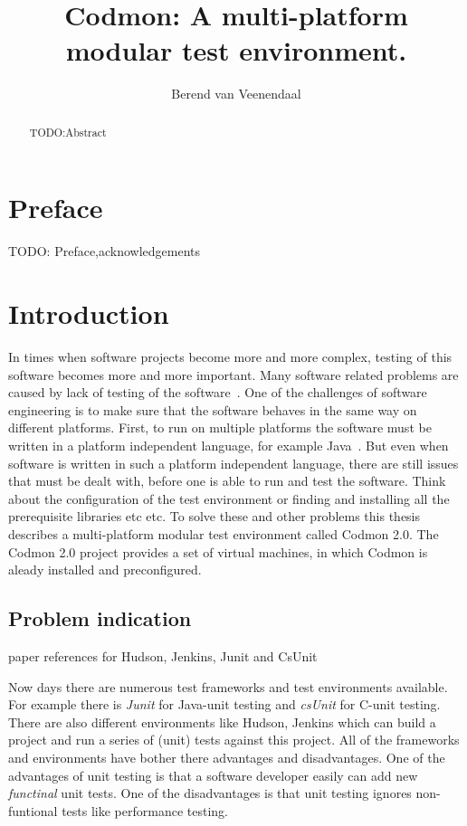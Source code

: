 \documentclass[a4paper,10pt]{scrartcl}
\title{Codmon: A multi-platform modular test environment.}
\author{Berend van Veenendaal}
\newcommand{\project}{Codmon 2.0}
\newcommand{\CS}{C\nolinebreak\hspace{-.05em}\raisebox{.6ex}{\bf \#}}
\begin{document}
\maketitle

\begin{abstract}
TODO:Abstract
\end{abstract}
\newpage
\section*{Preface}
\label{sec:Preface}
TODO: Preface,acknowledgements
\newpage
\tableofcontents
\newpage

\section{Introduction}
\label{sec:Introduction}
In times when software projects become more and more complex, testing of this software becomes more and more important. Many software
related problems are caused by lack of testing of the software~\cite{TTCST}. One of the challenges of software engineering is to make
sure that the software behaves in the same way on different platforms. First, to run on multiple platforms the software must be written in a
platform independent language, for example Java~\cite{Java}. But even when software is written in such a platform independent language, there 
are still issues that must be dealt with, before one is able to run and test the software. Think about the configuration of the test environment 
or finding and installing all the prerequisite libraries etc etc. To solve these and other problems this thesis describes a multi-platform modular
test environment called \project{}. The \project{} project provides a set of virtual machines, in which Codmon is aleady installed and
preconfigured.

\subsection{Problem indication}
\label{subsec:Problemindication}
\TODO paper references for Hudson, Jenkins, Junit and CsUnit 


Now days there are numerous test frameworks and test environments available. For example there is \emph{Junit} for Java-unit testing and \emph{csUnit} for \CS{}-unit testing.
There are also different environments like Hudson, Jenkins which can build a project and run a series of (unit) tests against this project. All of the frameworks
and environments have bother there advantages and disadvantages. One of the advantages of unit testing is that a software developer easily can add new \emph{functinal} unit tests.
One of the disadvantages is that unit testing ignores non-funtional tests like performance testing. 
\end{document}
